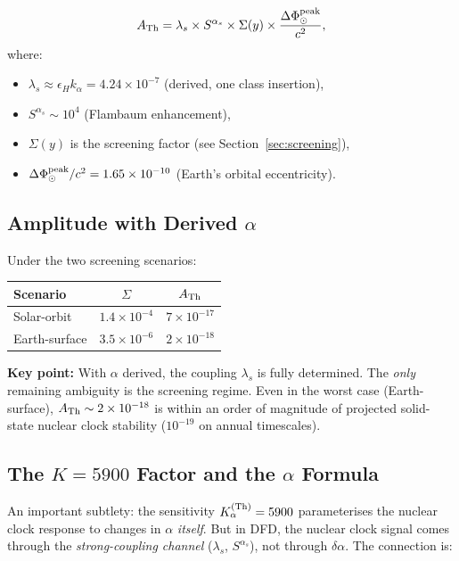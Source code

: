 \documentclass[11pt]{article}
\newcommand{\kalpha}{k_\alpha}
\theoremstyle{definition}
\theoremstyle{remark}
\begin{document}
\begin{equation}\label{eq:Th-signal}
A_{\rm Th} = \lambda_s \times S^{\alpha_s} \times \Sigma(y)
\times \frac{\Delta\Phi_\odot^{\rm peak}}{c^2},
\end{equation}
where:
\begin{itemize}
\item $\lambda_s \approx \epsilon_H \kalpha = 4.24 \times 10^{-7}$
  (derived, one class insertion),
\item $S^{\alpha_s} \sim 10^4$ (Flambaum enhancement),
\item $\Sigma(y)$ is the screening factor (see Section~\ref{sec:screening}),
\item $\Delta\Phi_\odot^{\rm peak}/c^2 = 1.65 \times 10^{-10}$
  (Earth's orbital eccentricity).
\end{itemize}

\subsection{Amplitude with Derived $\alpha$}

Under the two screening scenarios:

\begin{center}
\begin{tabular}{lcc}
\toprule
Scenario & $\Sigma$ & $A_{\rm Th}$ \\
\midrule
Solar-orbit & $1.4 \times 10^{-4}$ & $7 \times 10^{-17}$ \\
Earth-surface & $3.5 \times 10^{-6}$ & $2 \times 10^{-18}$ \\
\bottomrule
\end{tabular}
\end{center}

\textbf{Key point:} With $\alpha$ derived, the coupling $\lambda_s$ is
fully determined. The \emph{only} remaining ambiguity is the screening
regime. Even in the worst case (Earth-surface), $A_{\rm Th} \sim 2 \times
10^{-18}$ is within an order of magnitude of projected solid-state nuclear
clock stability ($10^{-19}$ on annual timescales).

\subsection{The $K = 5900$ Factor and the $\alpha$ Formula}

An important subtlety: the sensitivity $K_\alpha^{(\rm Th)} = 5900$
parameterises the nuclear clock response to changes in $\alpha$
\emph{itself}. But in DFD, the nuclear clock signal comes through the
\emph{strong-coupling channel} ($\lambda_s$, $S^{\alpha_s}$), not
through $\delta\alpha$. The connection is:
\end{document}
